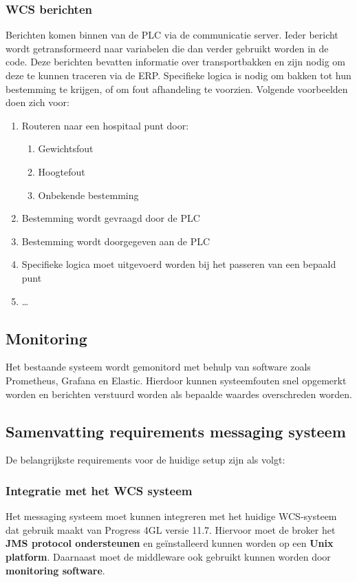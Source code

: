 \subsubsection{WCS berichten} 
Berichten komen binnen van de PLC via de communicatie server. Ieder bericht wordt getransformeerd naar variabelen die dan verder gebruikt worden in de code.
Deze berichten bevatten informatie over transportbakken en zijn nodig om deze te kunnen traceren via de ERP.
Specifieke logica is nodig om bakken tot hun bestemming te krijgen, of om fout afhandeling te voorzien.
Volgende voorbeelden doen zich voor:
\begin{enumerate}
  \item Routeren naar een hospitaal punt door: 
  \begin{enumerate}
    \item Gewichtsfout
    \item Hoogtefout
    \item Onbekende bestemming
  \end{enumerate}
  \item Bestemming wordt gevraagd door de PLC
  \item Bestemming wordt doorgegeven aan de PLC 
  \item Specifieke logica moet uitgevoerd worden bij het passeren van een bepaald punt
  \item \dots
\end{enumerate}

\subsection{Monitoring}
Het bestaande systeem wordt gemonitord met behulp van software zoals Prometheus, Grafana en Elastic.
Hierdoor kunnen systeemfouten snel opgemerkt worden en berichten verstuurd worden als bepaalde waardes overschreden worden.
 
\subsection{Samenvatting requirements messaging systeem}
De belangrijkste requirements voor de huidige setup zijn als volgt:

\subsubsection{Integratie met het WCS systeem}
Het messaging systeem moet kunnen integreren met het huidige WCS-systeem dat gebruik maakt van Progress 4GL versie 11.7. 
Hiervoor moet de broker het \textbf{JMS protocol ondersteunen} en geïnstalleerd kunnen worden op een \textbf{Unix platform}.
Daarnaast moet de middleware ook gebruikt kunnen worden door \textbf{monitoring software}.

